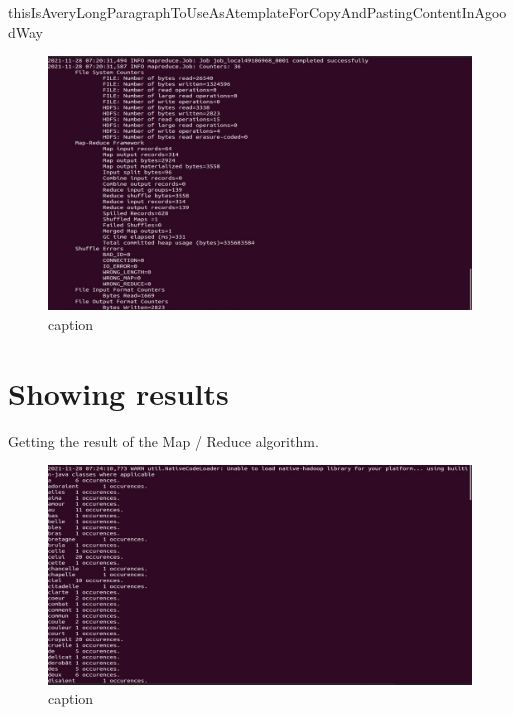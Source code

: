 \begin{spacing}{1.2}
\par thisIsAveryLongParagraphToUseAsAtemplateForCopyAndPastingContentInAgoodWay
\\
\begin{figure}[!htb] 
\begin{center} 
\includegraphics[width=1\linewidth]{Big_Data/Hadoop/Multi-Nodes Map_Reduce/running wordcount.jpg} 
\end{center} 
\caption{caption} 
\end{figure} 
\FloatBarrier


\section{Showing results}

\par Getting the result of the Map / Reduce algorithm.
\\
\begin{figure}[!htb] 
\begin{center} 
\includegraphics[width=1\linewidth]{Big_Data/Hadoop/Multi-Nodes Map_Reduce/Showing results.jpg} 
\end{center} 
\caption{caption} 
\end{figure} 
\FloatBarrier


\end{spacing}